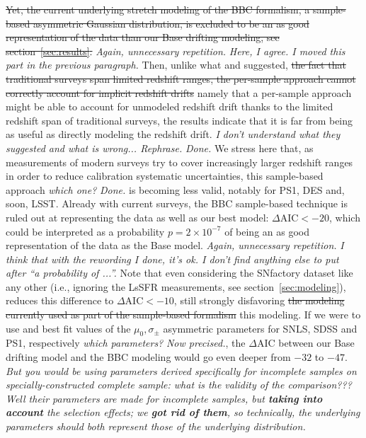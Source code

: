 \documentclass[]{aa} %
\newcommand{\mr}[1]{{\textcolor[rgb]{0.60,0.10,0.6}{#1}}}
\newcommand{\nn}[1]{{\textcolor[rgb]{0.25, 0.50, 0}{#1}}}
\newcommand{\yc}[1]{{\textcolor{BrickRed}{#1}}}
\begin{document}
\sout{Yet, the current underlying stretch modeling of the BBC formalism, a
sample-based asymmetric Gaussian distribution, is excluded to be an as good
representation of the data than our Base drifting modeling, see
section~\ref{sec:results}.} \yc{\textit{Again, unnecessary repetition.}}
\nn{\textit{Here, I agree. I moved this part in the previous paragraph.}} Then,
unlike what \citet[][section~2]{scolnic2016} and
\citet[][section~5.4]{scolnic2018a} suggested, \nn{\sout{the fact that
traditional surveys span limited redshift ranges, the per-sample approach
cannot correctly account for implicit redshift drifts} namely that a per-sample
approach might be able to account for unmodeled redshift drift thanks to the
limited redshift span of traditional surveys, the results indicate that it is
far from being as useful as directly modeling the redshift drift}. \yc{\textit{I
don't understand what they suggested and what is wrong...  Rephrase.}}
\nn{\textit{Done.}} We stress here that, as measurements of modern surveys
try to cover increasingly larger redshift ranges in order to
reduce calibration systematic uncertainties, this \nn{sample-based} approach
\yc{\textit{which one?}} \nn{\textit{Done.}}
is becoming less valid, notably for PS1, DES and, soon, LSST. Already with
current surveys, the BBC sample-based technique is ruled out at representing
the data as well as our best model: $\Delta\mathrm{AIC}<-20$, which could be
interpreted as a probability $p=2\times 10^{-7}$ of being an as good
representation of the data as the Base model. \yc{\textit{Again, unnecessary
repetition.}} \nn{\textit{I think that with the rewording I done, it's ok. I
don't find anything else to put after ``a probability of ...''.}}
Note that even considering the SNfactory dataset like any other
(i.e., ignoring the LsSFR measurements, see section~\ref{sec:modeling}),
reduces this difference to $\Delta\mathrm{AIC}<-10$, still strongly
disfavoring \nn{\sout{the modeling currently used as part of the \mr{sample-based
formalism}} this modeling}.
If we were to use \cite{scolnic2016} and \cite{scolnic2018a}
best fit values \nn{of the $\mu_0, \sigma_{\pm}$ asymmetric parameters}
for SNLS, SDSS and PS1, respectively \yc{\textit{which parameters?}}
\nn{\textit{Now precised.}},
the $\Delta$AIC between our Base drifting model and the BBC
modeling would go even deeper from $-32$ to $-47$. \yc{\textit{But you would be
using parameters derived specifically for incomplete samples on
specially-constructed complete sample: what is the validity of the
comparison???}} \nn{\textit{Well their parameters are made for incomplete
samples, but \textbf{taking into account} the selection effects; we \textbf{got
rid of them}, so technically, the underlying parameters should both represent
those of the underlying distribution.}}
\end{document}
